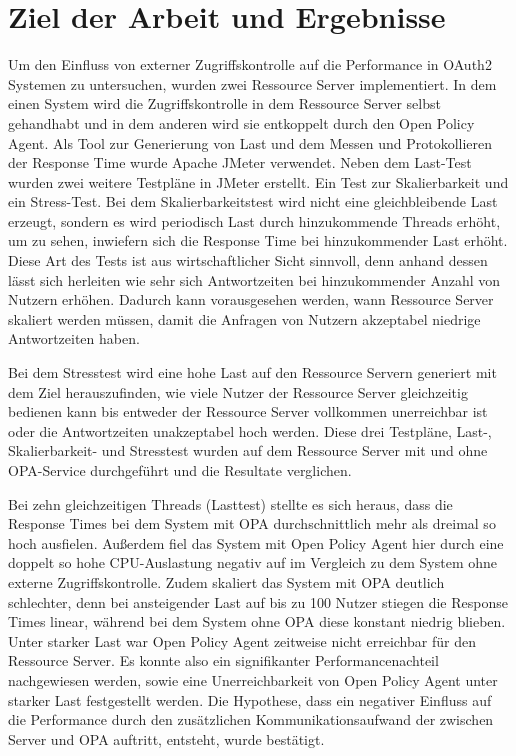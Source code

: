 \section{Ziel der Arbeit und Ergebnisse}
\label{sec:intro:goal}
Um den Einfluss von externer Zugriffskontrolle auf die Performance in OAuth2 Systemen zu untersuchen, wurden zwei Ressource Server implementiert. In dem einen System wird die Zugriffskontrolle in dem Ressource Server selbst gehandhabt und in dem anderen wird sie entkoppelt durch den Open Policy Agent. 
Als Tool zur Generierung von Last und dem Messen und Protokollieren der Response Time wurde Apache JMeter verwendet. Neben dem Last-Test wurden zwei weitere Testpläne in JMeter erstellt. Ein Test zur Skalierbarkeit und ein Stress-Test. Bei dem Skalierbarkeitstest wird nicht eine gleichbleibende Last erzeugt, sondern es wird periodisch Last durch hinzukommende Threads erhöht, um zu sehen, inwiefern sich die Response Time bei hinzukommender Last erhöht. Diese Art des Tests ist aus wirtschaftlicher Sicht sinnvoll, denn anhand dessen lässt sich herleiten wie sehr sich Antwortzeiten bei hinzukommender Anzahl von Nutzern erhöhen. Dadurch kann vorausgesehen werden, wann Ressource Server skaliert werden müssen, damit die Anfragen von Nutzern akzeptabel niedrige Antwortzeiten haben. \smallskip

Bei dem Stresstest wird eine hohe Last auf den Ressource Servern generiert mit dem Ziel herauszufinden, wie viele Nutzer der Ressource Server gleichzeitig bedienen kann bis entweder der Ressource Server vollkommen unerreichbar ist oder die Antwortzeiten unakzeptabel hoch werden. Diese drei Testpläne, Last-, Skalierbarkeit- und Stresstest wurden auf dem Ressource Server mit und ohne OPA-Service durchgeführt und die Resultate verglichen.\smallskip

Bei zehn gleichzeitigen Threads (Lasttest) stellte es sich heraus, dass die Response Times bei dem System mit OPA durchschnittlich mehr als dreimal so hoch ausfielen. Außerdem fiel das System mit Open Policy Agent hier durch eine doppelt so hohe \ac{CPU}-Auslastung negativ auf im Vergleich zu dem System ohne externe Zugriffskontrolle. Zudem skaliert das System mit \ac*{OPA} deutlich schlechter, denn bei ansteigender Last auf bis zu 100 Nutzer stiegen die Response Times linear, während bei dem System ohne OPA diese konstant niedrig blieben. Unter starker Last war Open Policy Agent zeitweise nicht erreichbar für den Ressource Server. Es konnte also ein signifikanter Performancenachteil nachgewiesen werden, sowie eine Unerreichbarkeit von Open Policy Agent unter starker Last festgestellt werden. Die Hypothese, dass ein negativer Einfluss auf die Performance durch den zusätzlichen Kommunikationsaufwand der zwischen Server und \ac*{OPA} auftritt, entsteht, wurde bestätigt.

